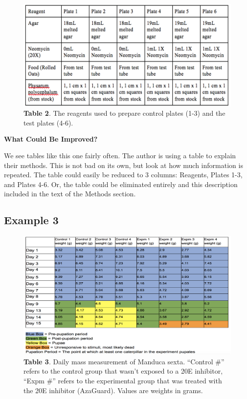\documentclass[
]{book}
\begin{document}
\begin{figure}
\centering
\includegraphics{images/Methods_table.png}
\caption{\textbf{Table 2}. The reagents used to prepare control plates (1-3) and the test plates (4-6).}
\end{figure}

\textbf{What Could Be Improved?}

We see tables like this one fairly often. The author is using a table to explain their methods. This is not bad on its own, but look at how much information is repeated. The table could easily be reduced to 3 columns: Reagents, Plates 1-3, and Plates 4-6. Or, the table could be eliminated entirely and this description included in the text of the Methods section.

\hypertarget{example-3-11}{%
\subsection{Example 3}\label{example-3-11}}

\begin{figure}
\centering
\includegraphics{images/Raw_data2.png}
\caption{\textbf{Table 3}. Daily mass measurement of Manduca sexta. ``Control \#'' refers to the control group that wasn't exposed to a 20E inhibitor, ``Expm \#'' refers to the experimental group that was treated with the 20E inhibitor (AzaGuard). Values are weights in grams.}
\end{figure}
\end{document}
